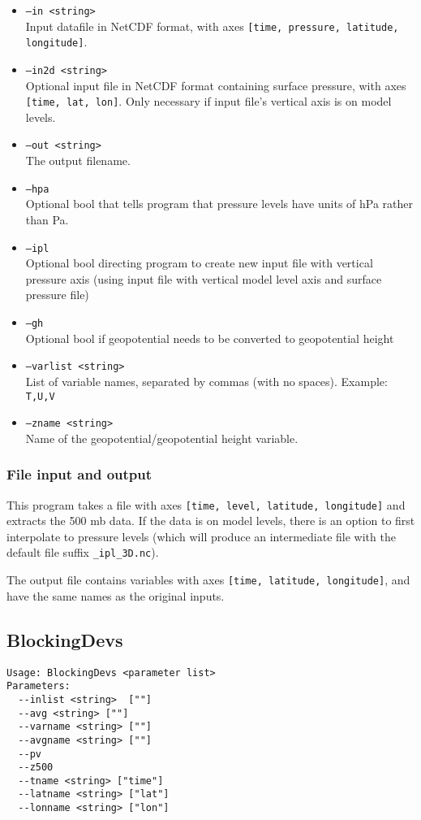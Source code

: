 \documentclass{article}
\begin{document}
\begin{itemize}
\item[]\texttt{--in <string>} \\ Input datafile  in NetCDF format, with axes \texttt{[time, pressure, latitude, longitude]}. 
\item[]\texttt{--in2d <string>} \\ Optional input file in NetCDF format containing surface pressure, with axes \texttt{[time, lat, lon]}. Only necessary if input file's vertical axis is on model levels.
\item[] \texttt{--out <string>}\\ The output filename.
\item[]\texttt{--hpa} \\ Optional bool that tells program that pressure levels have units of hPa rather than Pa.
\item[]\texttt{--ipl}\\ Optional bool directing program to create new input file with vertical pressure axis (using input file with vertical model level axis and surface pressure file)
\item[] \texttt{--gh}\\ Optional bool if geopotential needs to be converted to geopotential height
\item[] \texttt{--varlist <string>}\\ List of variable names, separated by commas (with no spaces). Example: \texttt{T,U,V}
\item[]\texttt{--zname <string>} \\Name of the geopotential/geopotential height variable.
\end{itemize}

\subsubsection{File input and output}
This program takes a file with axes \texttt{[time, level, latitude, longitude]} and extracts the 500 mb data. If the data is on model levels, there is an option to first interpolate to pressure levels (which will produce an intermediate file with the default file suffix \texttt{\_ipl\_3D.nc}).

The output file contains variables  with axes \texttt{[time, latitude, longitude]}, and have the same names as the original inputs. 

\subsection{BlockingDevs}\label{dev}
\begin{verbatim}
Usage: BlockingDevs <parameter list>
Parameters:
  --inlist <string>  [""]
  --avg <string> [""]
  --varname <string> [""]
  --avgname <string> [""]
  --pv
  --z500
  --tname <string> ["time"]
  --latname <string> ["lat"]
  --lonname <string> ["lon"]
\end{verbatim}
\end{document}
